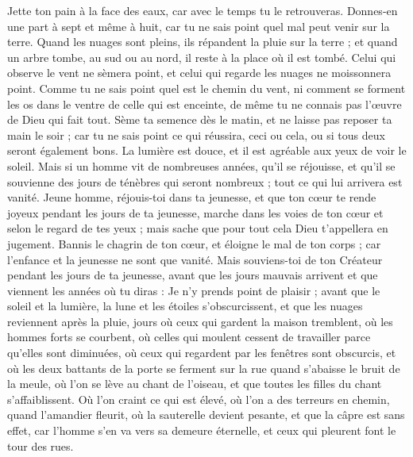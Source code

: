 \begin{multicols}{2}
\VerseOne{}Jette ton pain à la face des eaux, car avec le temps tu le retrouveras.
Donnes-en une part à sept et même à huit, car tu ne sais point quel mal peut venir sur la terre.
Quand les nuages sont pleins, ils répandent la pluie sur la terre ; et quand un arbre tombe, au sud ou au nord, il reste à la place où il est tombé.
Celui qui observe le vent ne sèmera point, et celui qui regarde les nuages ne moissonnera point.
Comme tu ne sais point quel est le chemin du vent, ni comment se forment les os dans le ventre de celle qui est enceinte, de même tu ne connais pas l'œuvre de Dieu qui fait tout.
Sème ta semence dès le matin, et ne laisse pas reposer ta main le soir ; car tu ne sais point ce qui réussira, ceci ou cela, ou si tous deux seront également bons.
La lumière est douce, et il est agréable aux yeux de voir le soleil.
Mais si un homme vit de nombreuses années, qu'il se réjouisse, et qu'il se souvienne des jours de ténèbres qui seront nombreux ; tout ce qui lui arrivera est vanité.
\VerseOne{}Jeune homme, réjouis-toi dans ta jeunesse, et que ton cœur te rende joyeux pendant les jours de ta jeunesse, marche dans les voies de ton cœur et selon le regard de tes yeux ; mais sache que pour tout cela Dieu t’appellera en jugement.
Bannis le chagrin de ton cœur, et éloigne le mal de ton corps ; car l’enfance et la jeunesse ne sont que vanité.
Mais souviens-toi de ton Créateur pendant les jours de ta jeunesse, avant que les jours mauvais arrivent et que viennent les années où tu diras : Je n'y prends point de plaisir ;
avant que le soleil et la lumière, la lune et les étoiles s'obscurcissent, et que les nuages reviennent après la pluie,
jours où ceux qui gardent la maison tremblent, où les hommes forts se courbent, où celles qui moulent cessent de travailler parce qu'elles sont diminuées, où ceux qui regardent par les fenêtres sont obscurcis,
et où les deux battants de la porte se ferment sur la rue quand s’abaisse le bruit de la meule, où l’on se lève au chant de l'oiseau, et que toutes les filles du chant s’affaiblissent.
Où l’on craint ce qui est élevé, où l’on a des terreurs en chemin, quand l'amandier fleurit, où la sauterelle devient pesante, et que la câpre est sans effet, car l'homme s'en va vers sa demeure éternelle, et ceux qui pleurent font le tour des rues.

\end{multicols}
